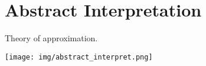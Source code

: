 \section{Abstract Interpretation}
Theory of approximation.

\texttt{[image: img/abstract\_interpret.png]}